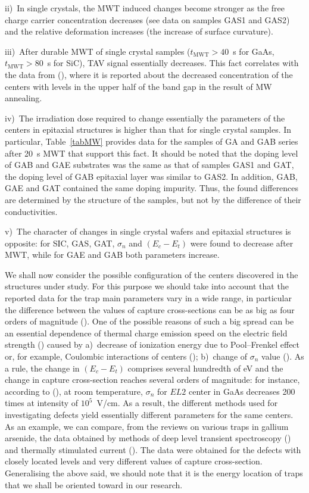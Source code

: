 \documentclass[final,3p,times,twocolumn,authoryear]{elsarticle}
\begin{document}
\noindent
ii)~In single crystals, the  MWT induced changes become stronger as the free charge carrier concentration decreases
(see data on samples GAS1 and GAS2) and the relative deformation increases (the increase of surface curvature).

\noindent
iii)~After durable MWT of single crystal samples ($t_\mathrm{MWT}>40$~s for GaAs,  $t_\mathrm{MWT}>80$~s for SiC),
TAV signal essentially decreases.
This fact correlates with the data  from (\cite{Belyaev1998JTFEn}),
where it is reported about  the decreased concentration of the centers with levels in the upper half of the band gap in the result of MW annealing.

\noindent
iv)~The irradiation dose required to change essentially the parameters of the centers in epitaxial structures is higher than that for single crystal samples.
In particular, Table~\ref{tabMW} provides  data for the samples of GA and GAB series after 20~s MWT
that support this fact.
It should be noted that the doping level of  GAB and GAE substrates was the same as that of samples GAS1 and GAT,
the doping level of GAB epitaxial layer was similar to GAS2.
In addition, GAB, GAE and GAT contained the same doping impurity.
Thus, the found differences are determined by the structure of the samples, but not by the difference of their conductivities.

\noindent
v)~The character of changes in single crystal wafers and epitaxial structures is opposite:
for SІC, GAS, GAT, $\sigma_n$ and $(E_c-E_t)$ were found to decrease after MWT,
while for GAE and GAB both parameters increase.

We shall now consider the possible configuration of the centers discovered in the structures under study.
For this purpose we should take into account that the reported data for the trap main parameters vary in a wide range,
in particular the difference between the values of capture cross-sections can be as big as four orders of magnitude (\cite{Pavlovic2000}).
One of the possible reasons of such a big spread can be an essential dependence
of thermal charge emission speed on  the electric field strength (\cite{Bulyarskii2000,Makram}) caused by
a)~decrease of ionization energy due to Pool--Frenkel effect or, for example, Coulombic interactions of centers (\cite{Stellmacher});
b)~change of $\sigma_n$  value (\cite{Bourgoin2001}).
As a rule, the change in $(E_c-E_t)$ comprises several hundredth of eV and
the change in capture cross-section reaches several orders of magnitude:
for instance, according to (\cite{Bourgoin2001}), at room temperature,
$\sigma_n$  for $EL2$ center in GaAs decreases 200 times
at intensity of $10^5$~V/cm.
As a result, the different methods used for investigating defects yield essentially different parameters for the same centers.
As an example, we can compare, from the reviews on various traps in gallium arsenide,
the data  obtained by methods of deep level transient spectroscopy (\cite{Bourgoin:GaAs})
and thermally stimulated current (\cite{Pavlovic2000}).
The data were obtained for the defects with closely located levels and very different values of capture cross-section.
Generalising the above said, we should note that it is the energy location of traps that we shall be oriented toward in our research.
\end{document}
